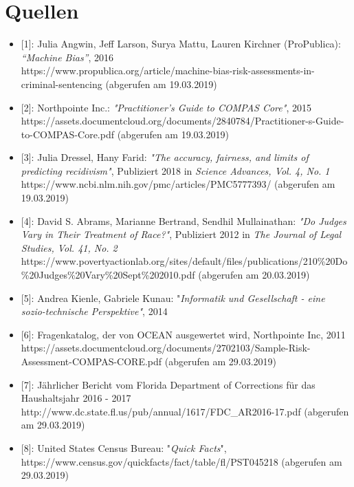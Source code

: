 \documentclass[10pt, a4paper, twocolumn]{article} %
\begin{document}
\section{Quellen}
\begin{itemize}
  \item{[1]}: 
    Julia Angwin, Jeff Larson, Surya Mattu, Lauren Kirchner (ProPublica): \textit{“Machine Bias”}, 2016\\
    https://www.propublica.org/article/machine-bias-risk-assessments-in-criminal-sentencing (abgerufen am 19.03.2019)

  \item{ [2]}: 
    Northpointe Inc.: \textit{"Practitioner’s Guide to COMPAS Core"}, 2015\\
    https://assets.documentcloud.org/documents/2840784/Practitioner-s-Guide-to-COMPAS-Core.pdf (abgerufen am 19.03.2019)

  \item  {[3]}:
    Julia Dressel, Hany Farid: \textit{"The accuracy, fairness, and limits of predicting recidivism"},
    Publiziert 2018 in \textit{Science Advances, Vol. 4, No. 1} \\ 
    https://www.ncbi.nlm.nih.gov/pmc/articles/PMC5777393/  (abgerufen am 19.03.2019)
  \item{[4]}:
    David S. Abrams, Marianne Bertrand, Sendhil Mullainathan: \textit{"Do Judges Vary in Their Treatment of Race?"},
    Publiziert 2012 in \textit{The Journal of Legal Studies, Vol. 41, No. 2} \\
    https://www.povertyactionlab.org/sites/default/files/publications/210\%20Do\%20Judges\%20Vary\%20Sept\%202010.pdf (abgerufen am 20.03.2019)
  \item{[5]}:
    Andrea Kienle, Gabriele Kunau: "\textit{Informatik und Gesellschaft - eine sozio-technische Perspektive"}, 2014
  \item{[6]}:
    Fragenkatalog, der von OCEAN ausgewertet wird, Northpointe Inc, 2011\\
    https://assets.documentcloud.org/documents/2702103/Sample-Risk-Assessment-COMPAS-CORE.pdf (abgerufen am 29.03.2019)
  \item{[7]}:
    Jährlicher Bericht vom Florida Department of Corrections für das Haushaltsjahr 2016 - 2017\\
    http://www.dc.state.fl.us/pub/annual/1617/FDC\_AR2016-17.pdf (abgerufen am 29.03.2019)
  \item{[8]}:
    United States Census Bureau: "\textit{Quick Facts}",
    https://www.census.gov/quickfacts/fact/table/fl/PST045218 (abgerufen am 29.03.2019)
\end{itemize}

\end{document}
